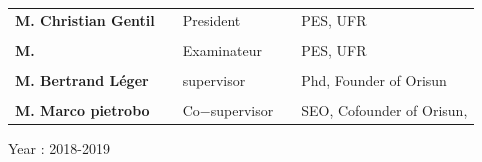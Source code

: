 \documentclass[11pt]{report}           %
\begin{document}
\begin{titlepage}
\begin{center}
\vfill


\end{center}

\begin{table}[h!]
\centering
  \begin{tabular}{lllll}
\bf{M. Christian Gentil}   & & President & & PES, UFR \\
           & &  & & \\
 \bf{M.  }            & & Examinateur & & PES, UFR \\
             & &  & &  \\
 
 \bf{M. Bertrand Léger }   & & supervisor & & Phd, Founder of Orisun\\
           & &  & & \\
\bf{M. Marco pietrobo }   & & Co$-$supervisor & & SEO, Cofounder of Orisun,
\end{tabular}
\end{table}

\large{


\vspace{0.7cm}

\begin{center}
	Year : 2018-2019
\end{center}
}

\end{titlepage}




\end{document}
